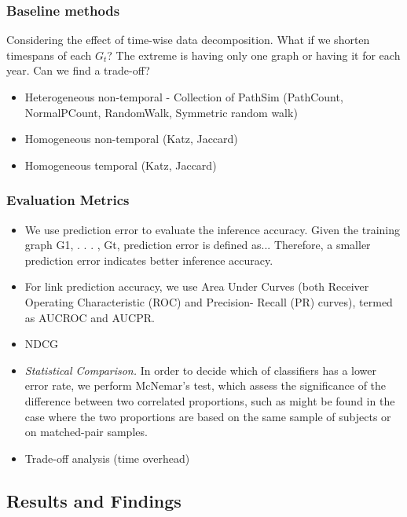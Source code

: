 \subsubsection{Baseline methods}

Considering the effect of time-wise data decomposition. What if we shorten timespans of each $G_t$? The extreme is having only one graph or having it for each year. Can we find a trade-off?

\begin{itemize}
    \item  Heterogeneous non-temporal - Collection of PathSim (PathCount, NormalPCount, RandomWalk, Symmetric random walk)
    \item  Homogeneous non-temporal (Katz, Jaccard)
    \item  Homogeneous temporal (Katz, Jaccard)
\end{itemize}

\subsubsection{Evaluation Metrics}

\begin{itemize}
    \item We use prediction error to evaluate the inference accuracy. Given the training graph G1, . . . , Gt, prediction error is defined as... Therefore, a smaller prediction error indicates better inference accuracy.
    
    \item For link prediction accuracy, we use Area Under Curves
(both Receiver Operating Characteristic (ROC) and Precision-
Recall (PR) curves), termed as AUCROC and AUCPR.

    \item NDCG
    
     \item \textit{Statistical Comparison.} In order to decide which of classifiers has a lower error rate, we perform McNemar's test, which assess the significance of the difference between two correlated proportions, such as might be found in the case where the two proportions are based on the same sample of subjects or on matched-pair samples.
   
    \item Trade-off analysis (time overhead)
    
\end{itemize}


\subsection{Results and Findings}

